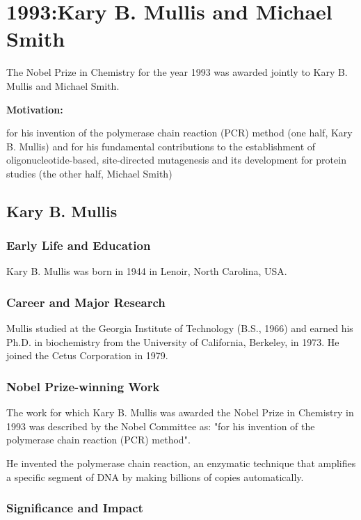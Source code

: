 \chapter{1993:Kary B. Mullis and Michael Smith}

\label{chap:chemistry1993}

The Nobel Prize in Chemistry for the year 1993 was awarded jointly to Kary B. Mullis and Michael Smith.

\textbf{Motivation:}

for his invention of the polymerase chain reaction (PCR) method (one half, Kary B. Mullis) and for his fundamental contributions to the establishment of oligonucleotide-based, site-directed mutagenesis and its development for protein studies (the other half, Michael Smith)

\section{Kary B. Mullis}

\subsection*{Early Life and Education}

Kary B. Mullis was born in 1944 in Lenoir, North Carolina, USA.

\subsection*{Career and Major Research}

Mullis studied at the Georgia Institute of Technology (B.S., 1966) and earned his Ph.D. in biochemistry from the University of California, Berkeley, in 1973. He joined the Cetus Corporation in 1979.

\subsection*{Nobel Prize-winning Work}

The work for which Kary B. Mullis was awarded the Nobel Prize in Chemistry in 1993 was described by the Nobel Committee as: "for his invention of the polymerase chain reaction (PCR) method".

He invented the polymerase chain reaction, an enzymatic technique that amplifies a specific segment of DNA by making billions of copies automatically.

\subsection*{Significance and Impact}

